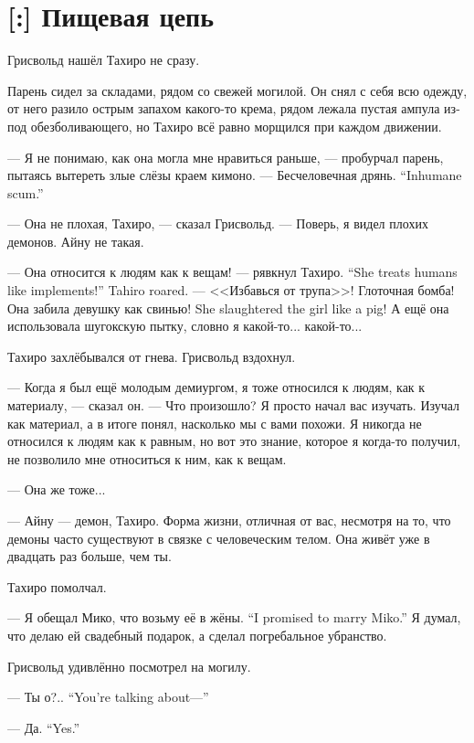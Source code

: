 \section{[:] Пищевая цепь}

Грисвольд нашёл Тахиро не сразу.

Парень сидел за складами, рядом со свежей могилой.
Он снял с себя всю одежду, от него разило острым запахом какого-то крема, рядом лежала пустая ампула из-под обезболивающего, но Тахиро всё равно морщился при каждом движении.

--- Я не понимаю, как она могла мне нравиться раньше, --- пробурчал парень, пытаясь вытереть злые слёзы краем кимоно.
{--- Бесчеловечная дрянь.}
{``Inhumane scum.''}

--- Она не плохая, Тахиро, --- сказал Грисвольд.
--- Поверь, я видел плохих демонов.
Айну не такая.

{--- Она относится к людям как к вещам! --- рявкнул Тахиро.}
{``She treats humans like implements!'' Tahiro roared.}
--- <<Избавься от трупа>>!
Глоточная бомба!
{Она забила девушку как свинью!}
{She slaughtered the girl like a pig!}
А ещё она использовала шугокскую пытку\FM, словно я какой-то... какой-то...

Тахиро захлёбывался от гнева.
Грисвольд вздохнул.

--- Когда я был ещё молодым демиургом, я тоже относился к людям, как к материалу, --- сказал он.
--- Что произошло?
Я просто начал вас изучать.
Изучал как материал, а в итоге понял, насколько мы с вами похожи.
Я никогда не относился к людям как к равным, но вот это знание, которое я когда-то получил, не позволило мне относиться к ним, как к вещам.

--- Она же тоже...

--- Айну --- демон, Тахиро.
Форма жизни, отличная от вас, несмотря на то, что демоны часто существуют в связке с человеческим телом.
Она живёт уже в двадцать раз больше, чем ты.

Тахиро помолчал.

{--- Я обещал Мико, что возьму её в жёны.}
{``I promised to marry Miko.''}
Я думал, что делаю ей свадебный подарок, а сделал погребальное убранство.

Грисвольд удивлённо посмотрел на могилу.

{--- Ты о?..}
{``You're talking about---''}

{--- Да.}
{``Yes.''}

